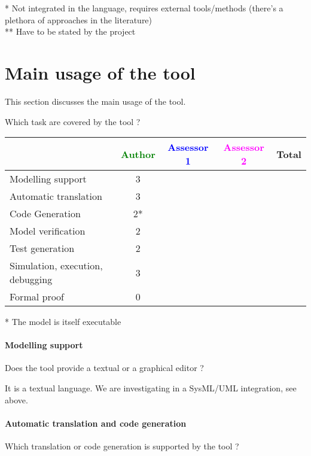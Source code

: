\begin{author_comment}
 * Not integrated in the language, requires external tools/methods (there's a plethora of approaches in the literature)\\
 ** Have to be stated by the project
\end{author_comment}

\section{Main usage of the tool}
\label{main_usage}

This section discusses the main usage of the tool.

Which task are covered by the tool ?


\begin{tabular}{|l | c | c | c | c|}
\hline
& \textcolor{green}{Author} & \textcolor{blue}{Assessor 1} & \textcolor{magenta}{Assessor 2} & Total \\
\hline
Modelling support &3 & & & \\
\hline
Automatic translation &3 & & & \\
\hline
Code Generation &2* & & & \\
\hline
Model verification &2 & & & \\
\hline
Test generation &2 & & & \\
\hline
Simulation, execution, debugging &3 & & & \\
\hline
Formal proof &0 & & & \\
\hline
\end{tabular}

\begin{author_comment}
 * The model is itself executable
\end{author_comment}

\paragraph{Modelling support}
Does the tool provide a textual or a graphical editor ?

It is a textual language. We are investigating in a SysML/UML integration, see above.

\paragraph{Automatic translation and code generation}
Which translation or code generation is supported by the tool ?

